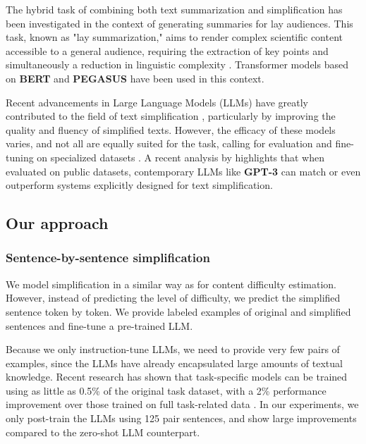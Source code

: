 The hybrid task of combining both text summarization and simplification has been investigated in the context of generating summaries for lay audiences. This task, known as "lay summarization," aims to render complex scientific content accessible to a general audience, requiring the extraction of key points and simultaneously a reduction in linguistic complexity \cite{lay_vinzelberg_2023,divide_chaturvedi_2020}. Transformer models based on \textbf{BERT} \cite{Devlin2019BERT} and \textbf{PEGASUS} \cite{zhang2020pegasus} have been used in this context.

Recent advancements in Large Language Models (LLMs) have greatly contributed to the field of text simplification \cite{language_radford_2019}, particularly by improving the quality and fluency of simplified texts. However, the efficacy of these models varies, and not all are equally suited for the task, calling for evaluation and fine-tuning on specialized datasets \cite{sentence_shatilov_2021}. A recent analysis by \cite{sentence_feng_2023} highlights that when evaluated on public datasets, contemporary LLMs like \textbf{GPT-3} can match or even outperform systems explicitly designed for text simplification.

\subsection{Our approach}

\subsubsection{Sentence-by-sentence simplification}

We model simplification in a similar way as for content difficulty estimation. However, instead of predicting the level of difficulty, we predict the simplified sentence token by token. We provide labeled examples of original and simplified sentences and fine-tune a pre-trained LLM.

Because we only instruction-tune LLMs, we need to provide very few pairs of examples, since the LLMs have already encapsulated large amounts of textual knowledge. Recent research has shown that task-specific models can be trained using as little as 0.5\% of the original task dataset, with a 2\% performance improvement over those trained on full task-related data \cite{Chen2023Maybe}. In our experiments, we only post-train the LLMs using 125 pair sentences, and show large improvements compared to the zero-shot LLM counterpart.

